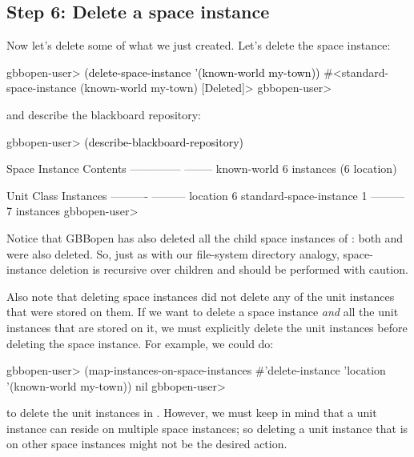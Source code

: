 \documentclass[10pt,twoside,english,pdftex]{article}
\begin{document}
\subsection*{Step 6: Delete a space instance}

%
%
Now let's delete some of what we just created.  Let's delete the
 space instance:
%
\W\supp
\begin{example}
\textcolor{darkergray}{%
  gbbopen-user> \textcolor{black}{(delete-space-instance '(known-world my-town))}
  #<standard-space-instance (known-world my-town) [Deleted]>
  gbbopen-user>}
\end{example}
%
%
and describe the blackboard repository:
%
\W\supp\notpretop
\begin{example}
\textcolor{darkergray}{%
  gbbopen-user> \textcolor{black}{(describe-blackboard-repository)}

  Space Instance                Contents
  --------------                --------
  known-world                   6 instances (6 location)

  Unit Class                    Instances
  ----------                    ---------
  location                              6
  standard-space-instance               1
                                ---------
                                        7 instances
  gbbopen-user>}
\end{example}
%
Notice that GBBopen has also deleted all the child space instances of
: both  and  were also deleted.
So, just as with our file-system directory analogy, space-instance deletion is
recursive over children and should be performed with caution.  

%
%
Also note that deleting space instances did not delete any of the unit
instances that were stored on them.  If we want to delete a space instance
\textit{and\/} all the unit instances that are stored on it, we must
explicitly delete the unit instances before deleting the space instance.
For example, we could do:
%
\W\supp
\begin{example}
\textcolor{darkergray}{%
  gbbopen-user> (map-instances-on-space-instances #'delete-instance 
                  'location '(known-world my-town))
  nil
  gbbopen-user>}
\end{example}
%
to delete the unit instances in .  However, we must keep in mind
that a unit instance can reside on multiple space instances; so deleting a
unit instance that is on other space instances might not be the desired
action.
\end{document}
